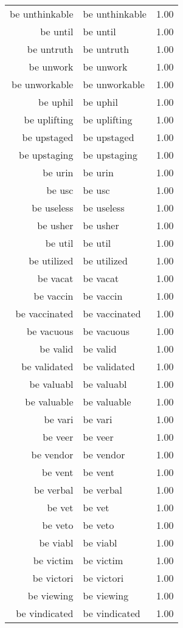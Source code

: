 \begin{table}[ht]
\begin{tabular}{rlr}
  be unthinkable & be unthinkable & 1.00 \\ 
  be until & be until & 1.00 \\ 
  be untruth & be untruth & 1.00 \\ 
  be unwork & be unwork & 1.00 \\ 
  be unworkable & be unworkable & 1.00 \\ 
  be uphil & be uphil & 1.00 \\ 
  be uplifting & be uplifting & 1.00 \\ 
  be upstaged & be upstaged & 1.00 \\ 
  be upstaging & be upstaging & 1.00 \\ 
  be urin & be urin & 1.00 \\ 
  be usc & be usc & 1.00 \\ 
  be useless & be useless & 1.00 \\ 
  be usher & be usher & 1.00 \\ 
  be util & be util & 1.00 \\ 
  be utilized & be utilized & 1.00 \\ 
  be vacat & be vacat & 1.00 \\ 
  be vaccin & be vaccin & 1.00 \\ 
  be vaccinated & be vaccinated & 1.00 \\ 
  be vacuous & be vacuous & 1.00 \\ 
  be valid & be valid & 1.00 \\ 
  be validated & be validated & 1.00 \\ 
  be valuabl & be valuabl & 1.00 \\ 
  be valuable & be valuable & 1.00 \\ 
  be vari & be vari & 1.00 \\ 
  be veer & be veer & 1.00 \\ 
  be vendor & be vendor & 1.00 \\ 
  be vent & be vent & 1.00 \\ 
  be verbal & be verbal & 1.00 \\ 
  be vet & be vet & 1.00 \\ 
  be veto & be veto & 1.00 \\ 
  be viabl & be viabl & 1.00 \\ 
  be victim & be victim & 1.00 \\ 
  be victori & be victori & 1.00 \\ 
  be viewing & be viewing & 1.00 \\ 
  be vindicated & be vindicated & 1.00 \\ 

\end{tabular}
\end{table}

